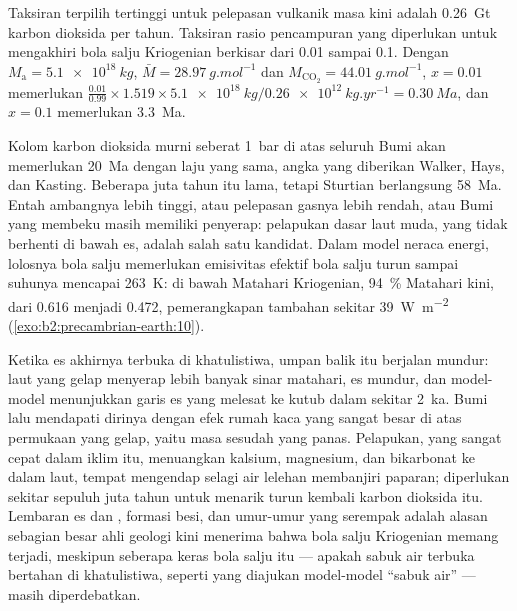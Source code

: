 \begin{example}\label{ex:b2:precambrian-earth:escape}
Taksiran terpilih tertinggi untuk pelepasan vulkanik masa kini adalah \qty{0.26}{Gt} karbon
dioksida per tahun. Taksiran
rasio pencampuran yang diperlukan untuk mengakhiri bola salju Kriogenian berkisar dari 0.01 sampai 0.1. Dengan $M_{\text{a}} =
\qty{5.1e18}{kg}$, $\bar M = \qty{28.97}{g.mol^{-1}}$ dan $M_{\mathrm{CO_2}} =
\qty{44.01}{g.mol^{-1}}$, $x = 0.01$ memerlukan $\frac{0.01}{0.99}\times1.519\times\qty{5.1e18}{kg}
/ \qty{0.26e12}{kg.yr^{-1}} = \qty{0.30}{Ma}$, dan $x = 0.1$ memerlukan \qty{3.3}{Ma}.
\end{example}

Kolom karbon dioksida murni seberat \qty{1}{bar} di atas seluruh Bumi akan memerlukan
\qty{20}{Ma} dengan laju yang sama, angka yang diberikan Walker, Hays, dan Kasting. Beberapa juta tahun
itu lama, tetapi Sturtian berlangsung \qty{58}{Ma}. Entah ambangnya lebih tinggi, atau
pelepasan gasnya lebih rendah, atau Bumi yang membeku masih memiliki penyerap: pelapukan dasar laut muda,
yang tidak berhenti di bawah es, adalah salah satu kandidat. Dalam model neraca energi, lolosnya bola salju memerlukan
emisivitas efektif bola salju turun sampai suhunya mencapai \qty{263}{K}: di bawah
Matahari Kriogenian, \qty{94}{\percent} Matahari kini, dari 0.616 menjadi 0.472, pemerangkapan tambahan
sekitar \qty{39}{W.m^{-2}} (\cref{exo:b2:precambrian-earth:10}).

Ketika es akhirnya terbuka di khatulistiwa, umpan balik itu berjalan mundur: laut yang gelap menyerap lebih banyak
sinar matahari, es mundur, dan model-model menunjukkan garis es yang melesat ke kutub dalam sekitar
\qty{2}{ka}. Bumi lalu mendapati dirinya dengan efek rumah kaca yang sangat besar di atas permukaan yang gelap, yaitu masa
sesudah yang panas. Pelapukan, yang sangat cepat dalam iklim itu, menuangkan kalsium, magnesium, dan bikarbonat ke dalam
laut, tempat  mengendap selagi air lelehan membanjiri paparan; diperlukan
sekitar sepuluh juta tahun untuk menarik turun kembali karbon dioksida itu. Lembaran es dan , formasi besi, dan umur-umur yang serempak adalah alasan sebagian besar ahli geologi kini menerima
bahwa bola salju Kriogenian memang terjadi, meskipun seberapa keras bola salju itu --- apakah sabuk air
terbuka bertahan di khatulistiwa, seperti yang diajukan model-model ``sabuk air'' --- masih diperdebatkan.

